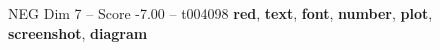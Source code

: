 \begin{textsample}{NEG Dim 7 – Score -7.00 – t004098}  \label{ex:f7_neg_014}
\textbf{red}, \textbf{text}, \textbf{font}, \textbf{number}, \textbf{plot}, \textbf{screenshot}, \textbf{diagram}

\end{textsample}

